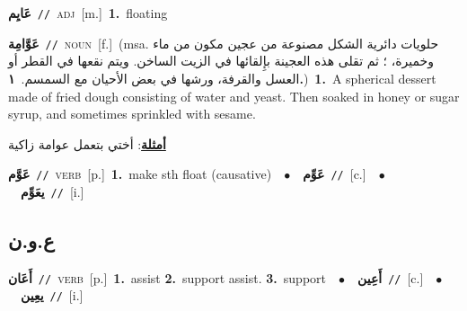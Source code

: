 \documentclass[10pt,a4paper,twoside]{article} %
\begin{document}
\begin{multicols}{2}
{\setlength\topsep{0pt}\textbf{\foreignlanguage{arabic}{عَايِم}}\ {\color{gray}\texttt{//}\color{black}}\ \textsc{adj}\ [m.]\ \textbf{1.}~floating\ } \vspace{2mm}

{\setlength\topsep{0pt}\textbf{\foreignlanguage{arabic}{عَوَّامِة}}\ {\color{gray}\texttt{//}\color{black}}\ \textsc{noun}\ [f.]\ \color{gray}(msa. \foreignlanguage{arabic}{حلويات دائرية الشكل مصنوعة من عجين مكون من ماء وخميرة، ؛ ثم تقلى هذه العجينة بإِلقائها في الزيت الساخن. ويتم نقعها في القطر أو العسل والقرفة، ورشها في بعض الأحيان مع السمسم.}~\foreignlanguage{arabic}{\textbf{١.}})\color{black}\ \textbf{1.}~A spherical dessert made of fried dough consisting of water and yeast. Then soaked in honey or sugar syrup, and sometimes sprinkled with sesame.\  \begin{flushright}\color{gray}\foreignlanguage{arabic}{\textbf{\underline{\foreignlanguage{arabic}{أمثلة}}}: أختي بتعمل عوامة زاكية}\end{flushright}\color{black}} \vspace{2mm}

{\setlength\topsep{0pt}\textbf{\foreignlanguage{arabic}{عَوَّم}}\ {\color{gray}\texttt{//}\color{black}}\ \textsc{verb}\ [p.]\ \textbf{1.}~make sth float (causative)\ \ $\bullet$\ \ \setlength\topsep{0pt}\textbf{\foreignlanguage{arabic}{عَوِّم}}\ {\color{gray}\texttt{//}\color{black}}\ [c.]\ \ $\bullet$\ \ \setlength\topsep{0pt}\textbf{\foreignlanguage{arabic}{يعَوِّم}}\ {\color{gray}\texttt{//}\color{black}}\ [i.]\ } \vspace{2mm}

\vspace{-3mm}
\subsection*{\color{blue}\foreignlanguage{arabic}{ع.و.ن}\color{blue}{}} 

{\setlength\topsep{0pt}\textbf{\foreignlanguage{arabic}{أَعَان}}\ {\color{gray}\texttt{//}\color{black}}\ \textsc{verb}\ [p.]\ \textbf{1.}~assist  \textbf{2.}~support assist.  \textbf{3.}~support\ \ $\bullet$\ \ \setlength\topsep{0pt}\textbf{\foreignlanguage{arabic}{أَعِين}}\ {\color{gray}\texttt{//}\color{black}}\ [c.]\ \ $\bullet$\ \ \setlength\topsep{0pt}\textbf{\foreignlanguage{arabic}{يعِين}}\ {\color{gray}\texttt{//}\color{black}}\ [i.]\ } \vspace{2mm}


\end{multicols}
\end{document}
